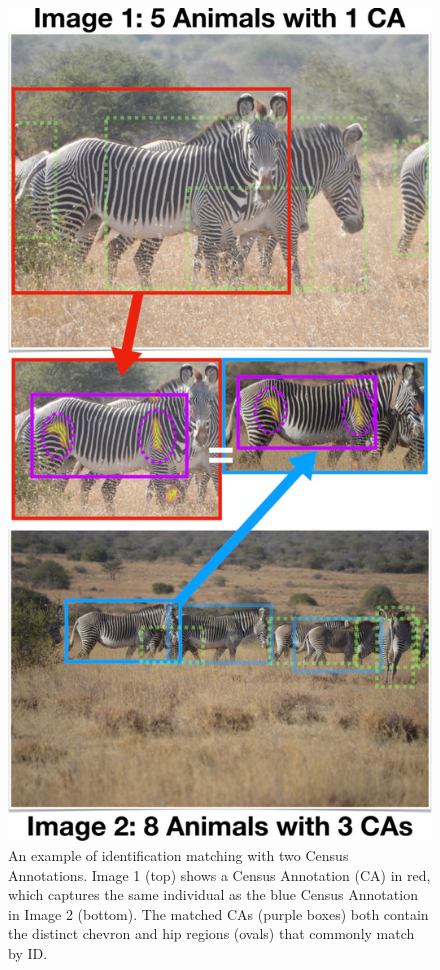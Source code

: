 \begin{figure}[!t]
    \begin{center}
        \includegraphics[width=0.58\linewidth]{resources/ca-example.pdf}
    \end{center}
    \caption{An example of identification matching with two Census Annotations.  Image 1 (top) shows a Census Annotation (CA) in red, which captures the same individual as the blue Census Annotation in Image 2 (bottom).  The matched CAs (purple boxes) both contain the distinct chevron and hip regions (ovals) that commonly match by ID.}
    \label{fig:ca-overview}
\end{figure}

